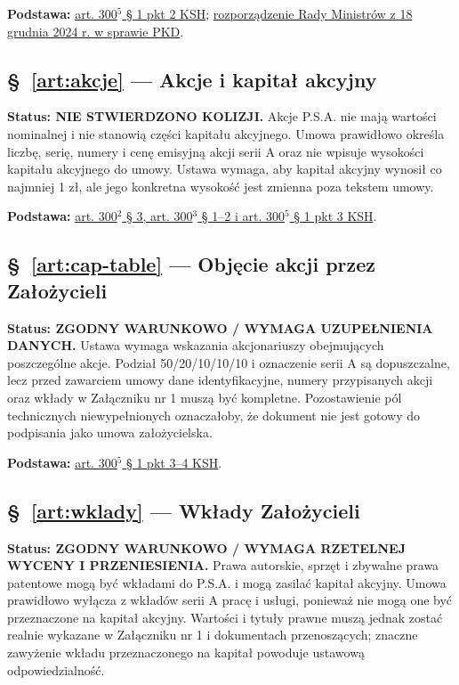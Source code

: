 \documentclass[12pt,a4paper]{report}
\begin{document}
\textbf{Podstawa:} \href{https://eli.gov.pl/api/acts/DU/2024/18/text.html}{art. 300$^{5}$ § 1 pkt 2 KSH}; \href{https://eli.gov.pl/eli/DU/2024/1936/ogl}{rozporządzenie Rady Ministrów z 18 grudnia 2024 r. w sprawie PKD}.

\subsection*{§~\ref{art:akcje} — Akcje i kapitał akcyjny}
\textbf{Status: NIE STWIERDZONO KOLIZJI.} Akcje P.S.A. nie mają wartości nominalnej i nie stanowią części kapitału akcyjnego. Umowa prawidłowo określa liczbę, serię, numery i cenę emisyjną akcji serii A oraz nie wpisuje wysokości kapitału akcyjnego do umowy. Ustawa wymaga, aby kapitał akcyjny wynosił co najmniej 1 zł, ale jego konkretna wysokość jest zmienna poza tekstem umowy.

\textbf{Podstawa:} \href{https://eli.gov.pl/api/acts/DU/2024/18/text.html}{art. 300$^{2}$ § 3, art. 300$^{3}$ § 1--2 i art. 300$^{5}$ § 1 pkt 3 KSH}.

\subsection*{§~\ref{art:cap-table} — Objęcie akcji przez Założycieli}
\textbf{Status: ZGODNY WARUNKOWO / WYMAGA UZUPEŁNIENIA DANYCH.} Ustawa wymaga wskazania akcjonariuszy obejmujących poszczególne akcje. Podział 50/20/10/10/10 i oznaczenie serii A są dopuszczalne, lecz przed zawarciem umowy dane identyfikacyjne, numery przypisanych akcji oraz wkłady w Załączniku nr 1 muszą być kompletne. Pozostawienie pól technicznych niewypełnionych oznaczałoby, że dokument nie jest gotowy do podpisania jako umowa założycielska.

\textbf{Podstawa:} \href{https://eli.gov.pl/api/acts/DU/2024/18/text.html}{art. 300$^{5}$ § 1 pkt 3--4 KSH}.

\subsection*{§~\ref{art:wklady} — Wkłady Założycieli}
\textbf{Status: ZGODNY WARUNKOWO / WYMAGA RZETELNEJ WYCENY I PRZENIESIENIA.} Prawa autorskie, sprzęt i zbywalne prawa patentowe mogą być wkładami do P.S.A. i mogą zasilać kapitał akcyjny. Umowa prawidłowo wyłącza z wkładów serii A pracę i usługi, ponieważ nie mogą one być przeznaczone na kapitał akcyjny. Wartości i tytuły prawne muszą jednak zostać realnie wykazane w Załączniku nr 1 i dokumentach przenoszących; znaczne zawyżenie wkładu przeznaczonego na kapitał powoduje ustawową odpowiedzialność.
\end{document}
